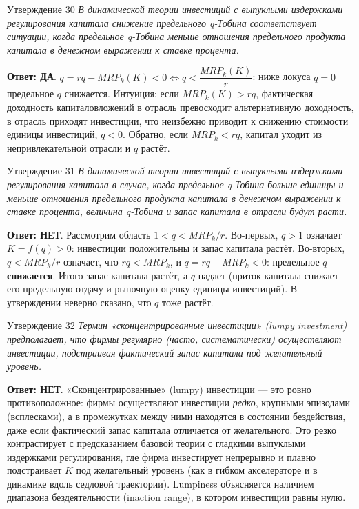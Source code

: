 \documentclass[10pt,a4paper]{article}
\newcommand{\qda}{\textbf{\color{yesgreen}Ответ: ДА}}
\newcommand{\qnet}{\textbf{\color{nored}Ответ: НЕТ}}
\newenvironment{answer}[2]{%
  \begin{qbox}{Утверждение #1}
  \textit{#2}\par\smallskip
}{%
  \end{qbox}\vspace{2pt}
}
\begin{document}
\begin{answer}{30}{В динамической теории инвестиций с выпуклыми издержками регулирования капитала снижение предельного q-Тобина соответствует ситуации, когда предельное q-Тобина меньше отношения предельного продукта капитала в денежном выражении к ставке процента.}
\qda. $\dot q=rq-MRP_k(K)<0 \Longleftrightarrow q<\dfrac{MRP_k(K)}{r}$: ниже локуса $\dot q=0$ предельное $q$ снижается. Интуиция: если $MRP_k(K)>rq$, фактическая доходность капиталовложений в отрасль превосходит альтернативную доходность, в отрасль приходят инвестиции, что неизбежно приводит к снижению стоимости единицы инвестиций, $\dot q<0$. Обратно, если $MRP_k<rq$, капитал уходит из непривлекательной отрасли и $q$ растёт.
\end{answer}

\begin{answer}{31}{В динамической теории инвестиций с выпуклыми издержками регулирования капитала в случае, когда предельное q-Тобина больше единицы и меньше отношения предельного продукта капитала в денежном выражении к ставке процента, величина q-Тобина и запас капитала в отрасли будут расти.}
\qnet. Рассмотрим область $1<q<MRP_k/r$. Во-первых, $q>1$ означает $\dot K=f(q)>0$: инвестиции положительны и запас капитала растёт. Во-вторых, $q<MRP_k/r$ означает, что $rq<MRP_k$, и $\dot q=rq-MRP_k<0$: предельное $q$ \textbf{снижается}. Итого запас капитала растёт, а $q$ падает (приток капитала снижает его предельную отдачу и рыночную оценку единицы инвестиций). В утверждении неверно сказано, что $q$ тоже растёт.
\end{answer}

\begin{answer}{32}{Термин «сконцентрированные инвестиции» (lumpy investment) предполагает, что фирмы регулярно (часто, систематически) осуществляют инвестиции, подстраивая фактический запас капитала под желательный уровень.}
\qnet. «Сконцентрированные» (lumpy) инвестиции --- это ровно противоположное: фирмы осуществляют инвестиции \emph{редко}, крупными эпизодами (всплесками), а в промежутках между ними находятся в состоянии бездействия, даже если фактический запас капитала отличается от желательного. Это резко контрастирует с предсказанием базовой теории с гладкими выпуклыми издержками регулирования, где фирма инвестирует непрерывно и плавно подстраивает $K$ под желательный уровень (как в гибком акселераторе и в динамике вдоль седловой траектории). Lumpiness объясняется наличием диапазона бездеятельности (inaction range), в котором инвестиции равны нулю.
\end{answer}
\end{document}
